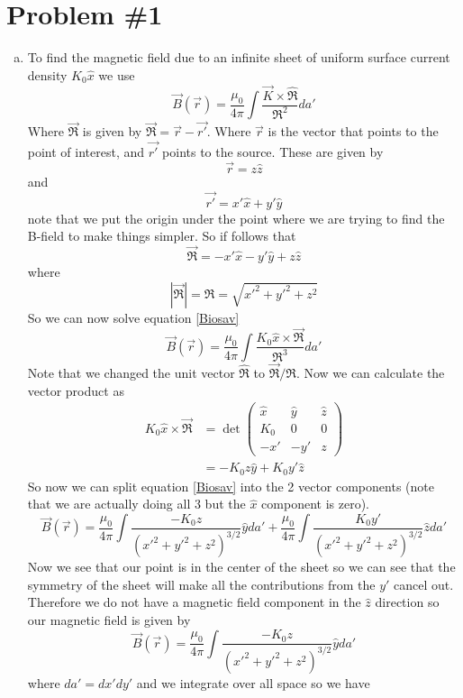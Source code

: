 \documentclass[11pt]{article}
\numberwithin{equation}{section}
\newcommand{\vecscrptR}{\vec{\mathfrak{R}}}
\newcommand{\scrptR}{\mathfrak{R}}
\begin{document}


\section{Problem \#1}
\begin{enumerate}[(a)]
\item
To find the magnetic field due to an infinite sheet of uniform surface current density $K_0\hat{x}$ we use 
\begin{equation}
\vec{B}(\vec{r}) = \frac{\mu_0}{4\pi}\int\frac{\vec{K}\times\hat{\scrptR}}{\scrptR^2}da'
\label{Biosav}
\end{equation}
Where $\vecscrptR$ is given by $\vecscrptR = \vec{r}-\vec{r'}$. Where $\vec{r}$ is the vector that points to the point of interest, and $\vec{r'}$ points to the source. These are given by
$$\vec{r} = z\hat{z}$$
and
$$\vec{r'} = x'\hat{x} + y'\hat{y}$$
note that we put the origin under the point where we are trying to find the B-field to make things simpler. So if follows that
$$\vecscrptR = -x'\hat{x} - y'\hat{y} + z\hat{z}$$
where
$$|\vecscrptR| = \scrptR = \sqrt{x'^2+y'^2+z^2}$$
So we can now solve equation \ref{Biosav}
$$\vec{B}(\vec{r}) = \frac{\mu_0}{4\pi}\int\frac{K_0\hat{x}\times\vecscrptR}{\scrptR^3}da'$$
Note that we changed the unit vector $\hat{\scrptR}$ to $\vecscrptR/\scrptR$. Now we can calculate the vector product as
\begin{align*}
{K_0\hat{x}\times\vecscrptR} &= \det\left(\begin{array}{ccc}
			\hat{x}		&\hat{y}	&\hat{z}	\\
			K_0		&0		&0		\\
			-x'		&-y'		&z
			\end{array}\right)\\
&= -K_0z\hat{y}+K_0y'\hat{z}
\end{align*}
So now we can split equation \ref{Biosav} into the 2 vector components (note that we are actually doing all 3 but the $\hat{x}$ component is zero).
$$\vec{B}(\vec{r}) = \frac{\mu_0}{4\pi}\int\frac{-K_0z}{(x'^2+y'^2+z^2)^{3/2}}\hat{y}da' + \frac{\mu_0}{4\pi}\int\frac{K_0y'}{(x'^2+y'^2+z^2)^{3/2}}\hat{z}da'$$
Now we see that our point is in the center of the sheet so we can see that the symmetry of the sheet will make all the contributions from the $y'$ cancel out. Therefore we do not have a magnetic field component in the $\hat{z}$ direction so our magnetic field is given by
$$\vec{B}(\vec{r}) = \frac{\mu_0}{4\pi}\int\frac{-K_0z}{(x'^2+y'^2+z^2)^{3/2}}\hat{y}da'$$
where $da'=dx'dy'$ and we integrate over all space so we have

\end{enumerate}
\end{document}
